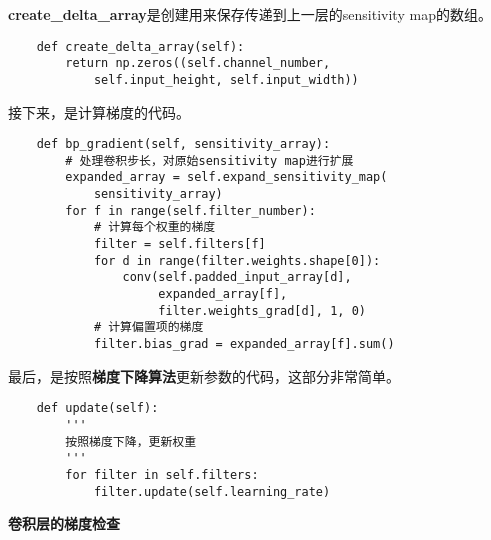 \textbf{create\_delta\_array}是创建用来保存传递到上一层的sensitivity
map的数组。
\begin{lstlisting}
    def create_delta_array(self):
        return np.zeros((self.channel_number,
            self.input_height, self.input_width))
\end{lstlisting}

接下来，是计算梯度的代码。
\begin{lstlisting}
    def bp_gradient(self, sensitivity_array):
        # 处理卷积步长，对原始sensitivity map进行扩展
        expanded_array = self.expand_sensitivity_map(
            sensitivity_array)
        for f in range(self.filter_number):
            # 计算每个权重的梯度
            filter = self.filters[f]
            for d in range(filter.weights.shape[0]):
                conv(self.padded_input_array[d], 
                     expanded_array[f],
                     filter.weights_grad[d], 1, 0)
            # 计算偏置项的梯度
            filter.bias_grad = expanded_array[f].sum()
\end{lstlisting}

最后，是按照\textbf{梯度下降算法}更新参数的代码，这部分非常简单。
\begin{lstlisting}
    def update(self):
        '''
        按照梯度下降，更新权重
        '''
        for filter in self.filters:
            filter.update(self.learning_rate)
\end{lstlisting}

\textbf{卷积层的梯度检查}

